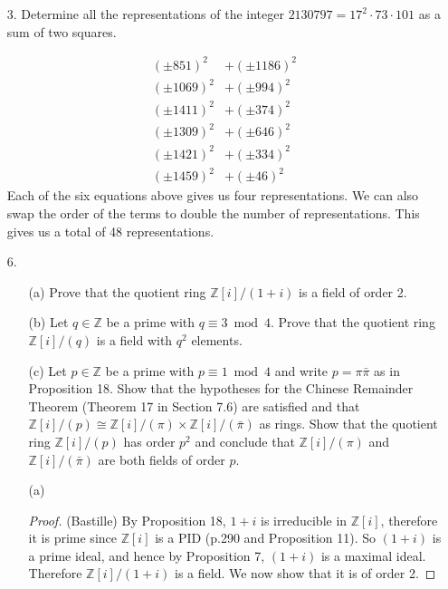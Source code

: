 \documentclass[10pt]{article}
\newcommand{\Z}{\mathbb{Z}}
\begin{document}
\begin{itemize}

\item[3.] Determine all the representations of the integer $2130797 = 17^2\cdot73\cdot101$ as a sum of two squares.

\begin{align*}
(\pm851)^2 &+ (\pm1186)^2\\
(\pm1069)^2 &+ (\pm994)^2\\
(\pm1411)^2 &+ (\pm374)^2\\
(\pm1309)^2 &+ (\pm646)^2\\
(\pm1421)^2 &+ (\pm334)^2\\
(\pm1459)^2 &+ (\pm46)^2
\end{align*}
Each of the six equations above gives us four representations.  We
can also swap the order of the terms to double the number of
representations.  This gives us a total of 48 representations.


\item[6.]
\begin{enumerate}
\item[(a)] Prove that the quotient ring $\Z[i]/(1+i)$ is a field of order 2.
\item[(b)] Let $q \in \Z$ be a prime with $q \equiv 3 \bmod 4$. Prove that the quotient ring $\Z[i]/(q)$ is a field with $q^2$ elements.
\item[(c)] Let $p \in \Z$ be a prime with $p \equiv 1 \bmod 4$ and write $p=\pi \bar{\pi}$ as in Proposition 18. Show that the hypotheses for the Chinese Remainder Theorem (Theorem 17 in Section 7.6) are satisfied and that $\Z[i]/(p) \cong \Z[i]/(\pi) \times \Z[i]/(\bar{\pi})$ as rings. Show that the quotient ring $\Z[i]/(p)$ has order $p^2$ and conclude that $\Z[i]/(\pi)$ and $\Z[i]/(\bar{\pi})$ are both fields of order $p$.
\item[(a)]
\begin{proof} (Bastille)
 By Proposition 18, $1+i$ is irreducible in $\Z[i]$, therefore it is prime since $\Z[i]$ is a PID (p.290 and Proposition 11). So $(1+i)$ is a prime ideal, and hence by Proposition 7, $(1+i)$ is a maximal ideal. Therefore $\Z[i]/(1+i)$ is a field. We now show that it is of order 2.


\end{proof}
\end{enumerate}
\end{itemize}
\end{document}

